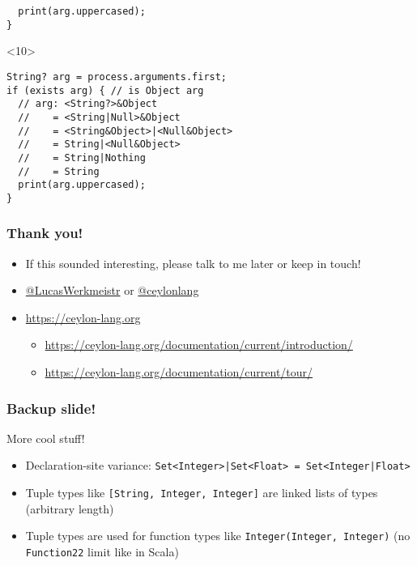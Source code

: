 \documentclass[aspectratio=169]{beamer}
\makeatletter
\newcommand{\TwitterUsername}[1]{\href{https://twitter.com/#1}{\ttfamily @#1}}
\makeatother
\begin{document}
\begin{frame}[fragile]
\begin{onlyenv}
\begin{lstlisting}
  print(arg.uppercased);
}
    \end{lstlisting}
  \end{onlyenv}
  \begin{onlyenv}<10>
    \begin{lstlisting}
String? arg = process.arguments.first;
if (exists arg) { // is Object arg
  // arg: <String?>&Object
  //    = <String|Null>&Object
  //    = <String&Object>|<Null&Object>
  //    = String|<Null&Object>
  //    = String|Nothing
  //    = String
  print(arg.uppercased);
}
    \end{lstlisting}
  \end{onlyenv}
\end{frame}

\begin{frame}
  \frametitle{Thank you!}
  \begin{itemize}
  \item If this sounded interesting, please talk to me later or keep in touch!
  \item \TwitterUsername{LucasWerkmeistr} or \TwitterUsername{ceylonlang}
  \item \url{https://ceylon-lang.org}
    \begin{itemize}
    \item \url{https://ceylon-lang.org/documentation/current/introduction/}
    \item \url{https://ceylon-lang.org/documentation/current/tour/}
    \end{itemize}
  \end{itemize}
\end{frame}

\begin{frame}
  \frametitle{Backup slide!}
  More cool stuff!
  \begin{itemize}
  \item Declaration-site variance: \lstinline{Set<Integer>|Set<Float> = Set<Integer|Float>}
  \item Tuple types like \lstinline{[String, Integer, Integer]} are linked lists of types (arbitrary length)
  \item Tuple types are used for function types like \lstinline{Integer(Integer, Integer)} (no \lstinline{Function22} limit like in Scala)
  \end{itemize}
\end{frame}
\end{document}
